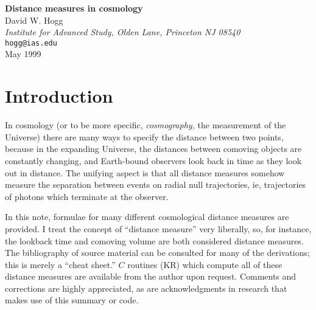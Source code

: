 

\newcommand{\simg}{\raisebox{-0.7ex}{\mbox{$\stackrel{\textstyle >}{\sim}$}}}
\newcommand{\siml}{\raisebox{-0.7ex}{\mbox{$\stackrel{\textstyle <}{\sim}$}}}
\newcommand{\bm}[1]{\mbox{\boldmath $#1$}}
\newenvironment{references}
	{\section{References}\begin{list}{}{
		\topsep=0in
		\partopsep=0in
		\itemsep=0in
		\parsep=0in
		\rightmargin=0in
		\leftmargin=3ex
		\itemindent=-1.0\leftmargin
		\labelsep=0in
		\labelwidth=0in}}
	{\end{list}}



\begin{center}
{\LARGE\bf Distance measures in cosmology} \\[1.0\baselineskip]
{\large\sc David W. Hogg} \\[0.5\baselineskip]
{\normalsize\sl Institute for Advanced Study, Olden Lane,
   Princeton NJ 08540} \\
{\normalsize\tt hogg@ias.edu} \\[0.5\baselineskip]
{May 1999}
\end{center}

\section{Introduction}

In cosmology (or to be more specific, {\em cosmography,\/} the
measurement of the Universe) there are many ways to specify the
distance between two points, because in the expanding Universe, the
distances between comoving objects are constantly changing, and
Earth-bound observers look back in time as they look out in distance.
The unifying aspect is that all distance measures somehow measure the
separation between events on radial null trajectories, ie,
trajectories of photons which terminate at the observer.

In this note, formulae for many different cosmological distance
measures are provided.  I treat the concept of ``distance measure''
very liberally, so, for instance, the lookback time and comoving
volume are both considered distance measures.  The bibliography of
source material can be consulted for many of the derivations; this is
merely a ``cheat sheet.''  $C$ routines (KR) which compute all of
these distance measures are available from the author upon request.
Comments and corrections are highly appreciated, as are
acknowledgments in research that makes use of this summary or code.


